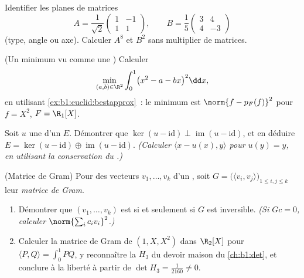 \begin{exercise}[$\star\star$]\label{exo:b1:euclid:8}
Identifier les  planes de matrices
\[
A = \frac{1}{\sqrt 2}\begin{pmatrix} 1 & -1\\ 1 & 1\end{pmatrix},
\qquad
B = \frac{1}{5}\begin{pmatrix} 3 & 4\\ 4 & -3\end{pmatrix}
\]
(type, angle ou axe). Calculer $A^8$ et $B^2$ sans multiplier de
matrices.
\end{exercise}

\begin{exercise}[$\star\star\star$]\label{exo:b1:euclid:9}
(Un minimum vu comme une ) Calculer
\[
\min_{(a, b) \in \R^2} \int_0^1 \bigl(x^2 - a - bx\bigr)^2 \dd x ,
\]
en utilisant \cref{ex:b1:euclid:bestapprox}~: le minimum est
$\norm{f - p_F(f)}^2$ pour $f = X^2$, $F = \R_1[X]$.
\end{exercise}

\begin{exercise}[$\star\star\star$]\label{exo:b1:euclid:10}
Soit $u$ une  d'un  $E$. Démontrer que
$\ker(u - \mathrm{id}) \perp \operatorname{im}(u - \mathrm{id})$,
et en déduire $E = \ker(u - \mathrm{id}) \oplus \operatorname{im}(u
- \mathrm{id})$. \emph{(Calculer $\langle x - u(x), y\rangle$ pour
$u(y) = y$, en utilisant la conservation du .)}
\end{exercise}

\begin{exercise}[$\star\star$]\label{exo:b1:euclid:11}
(Matrice de Gram) Pour des vecteurs $v_1, \dots, v_k$ d'un , soit $G = \bigl(\langle v_i, v_j\rangle\bigr)_{1 \leq i, j
\leq k}$ leur \emph{matrice de Gram}.
\begin{enumerate}
  \item Démontrer que $(v_1, \dots, v_k)$ est  si et
        seulement si $G$ est inversible. \emph{(Si $Gc = 0$,
        calculer $\norm{\sum_i c_i v_i}^2$.)}
  \item Calculer la matrice de Gram de $(1, X, X^2)$ dans
        $\R_2[X]$ pour $\langle P, Q\rangle = \int_0^1 PQ$, y
        reconnaître la  $H_3$ du devoir maison
        du \cref{ch:b1:det}, et conclure à la liberté à partir de
        $\det H_3 = \frac1{2160} \neq 0$.
\end{enumerate}
\end{exercise}

